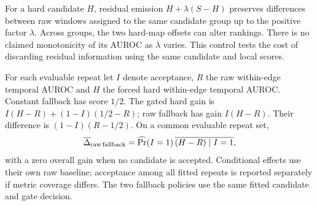 \documentclass[11pt]{article}
\begin{document}
For a hard candidate $H$, residual emission
$H+\lambda(S-H)$ preserves differences between raw windows assigned to the
same candidate group up to the positive factor $\lambda$. Across groups,
the two hard-map offsets can alter rankings. There is no claimed monotonicity
of its AUROC as $\lambda$ varies. This control tests the cost of discarding
residual information using the same candidate and local scores.

For each evaluable repeat let $I$ denote acceptance, $R$ the raw within-edge
temporal AUROC and $H$ the forced hard within-edge temporal AUROC. Constant fallback has score
$1/2$. The gated hard gain is
$I(H-R)+(1-I)(1/2-R)$; raw fallback has gain $I(H-R)$.
Their difference is $(1-I)(R-1/2)$. On a common evaluable repeat set,
\[
\overline\Delta_{\rm raw\,fallback}
=\widehat{\Pr}(I=1)\,
\overline{(H-R)\mid I=1},
\]
with a zero overall gain when no candidate is accepted. Conditional effects
use their own raw baseline; acceptance among all fitted repeats is reported
separately if metric coverage differs. The two fallback policies use the same fitted candidate and gate decision.

\begin{table}[!htbp]\centering\small
\caption{Auxiliary OLS score controls on Study A's retained fits. Every fixed
non-endpoint weight is shown, alongside raw and forced hard. Scores are
within-edge temporal AUROCs; $\lambda=1$ duplicates raw. These additional existing-output
comparisons have no primary-family interpretation.}
\label{tab:reviewer-ols}
\resizebox{\linewidth}{!}{}
\end{table}
\begin{table}[!htbp]\centering\small
\caption{Study B fallback separation with the acceptance decision unchanged.
All differences use the same repeats and their own raw baseline; intervals
are pointwise paired-repeat $95\%$ percentile-bootstrap intervals.
Repeated gated/forced hard contrasts use the original Study B summaries
(seed $20261024$); raw fallback retains the additional-controls stream
(seed $20261025$). A zero
raw-fallback gain with no acceptance is an exact emission identity.}
\label{tab:reviewer-fallback}
\resizebox{\linewidth}{!}{}
\end{table}
\end{document}
